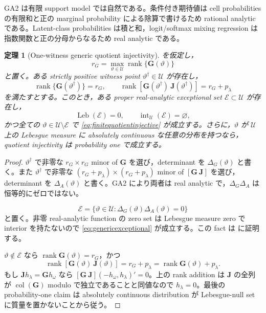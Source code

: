 \documentclass[11pt,a4paper]{ltjsarticle}
\newtheorem{theorem}{定理}[section]
\theoremstyle{remark}
\newcommand{\rank}{\operatorname{rank}}
\newcommand{\col}{\operatorname{col}}
\begin{document}
GA2 は有限 support model では自然である。条件付き期待値は cell probabilities の有限和と正の marginal probability による除算で書けるため rational analytic である。Latent-class probabilities は積と和，logit/softmax mixing regression は指数関数と正の分母からなるため real analytic である。

\begin{theorem}[One-witness generic quotient injectivity]\label{thm:genericquotient}
を仮定し，
\[
r_G=\max_{\vartheta\in\mathcal U}\rank\{\mathbf G(\vartheta)\}
\]
と置く。ある strictly positive witness point $\vartheta^\dagger\in\mathcal U$ が存在し，
\begin{equation}
\rank\{\mathbf G(\vartheta^\dagger)\}=r_G,
\qquad
\rank[\mathbf G(\vartheta^\dagger)\ \mathbf J(\vartheta^\dagger)]
=r_G+p_\lambda
\label{eq:genericwitness}
\end{equation}
を満たすとする。このとき，ある proper real-analytic exceptional set $\mathcal E\subset\mathcal U$ が存在し，
\begin{equation}
\operatorname{Leb}(\mathcal E)=0,
\qquad
\operatorname{int}_{\mathcal U}(\mathcal E)=\varnothing,
\label{eq:genericexceptional}
\end{equation}
かつ全ての $\vartheta\in\mathcal U\setminus\mathcal E$ で \eqref{eq:finitequotientinjective} が成立する。さらに，$\vartheta$ が $\mathcal U$ 上の Lebesgue measure に absolutely continuous な任意の分布を持つなら，quotient injectivity は probability one で成立する。
\end{theorem}

\begin{proof}
$\vartheta^\dagger$ で非零な $r_G\times r_G$ minor of $\mathbf G$ を選び，determinant を $\Delta_G(\vartheta)$ と書く。また $\vartheta^\dagger$ で非零な $(r_G+p_\lambda)\times(r_G+p_\lambda)$ minor of $[\mathbf G\ \mathbf J]$ を選び，determinant を $\Delta_A(\vartheta)$ と書く。GA2 により両者は real analytic で，$\Delta_G\Delta_A$ は恒等的にゼロではない。

\[
\mathcal E=\{\vartheta\in\mathcal U:\Delta_G(\vartheta)\Delta_A(\vartheta)=0\}
\]
と置く。非零 real-analytic function の zero set は Lebesgue measure zero で interior を持たないので \eqref{eq:genericexceptional} が成立する。この fact は  に証明する。

$\vartheta\notin\mathcal E$ なら $\rank\mathbf G(\vartheta)=r_G$，かつ
\[
\rank[\mathbf G(\vartheta)\ \mathbf J(\vartheta)]
=r_G+p_\lambda
=\rank\mathbf G(\vartheta)+p_\lambda.
\]
もし $\mathbf J h_\lambda=\mathbf G h_\omega$ なら $[\mathbf G\ \mathbf J](-h_\omega,h_\lambda)'=0$。上の rank addition は $\mathbf J$ の全列が $\col(\mathbf G)$ modulo で独立であることと同値なので $h_\lambda=0$。最後の probability-one claim は absolutely continuous distribution が Lebesgue-null set に質量を置かないことから従う。
\end{proof}
\end{document}
